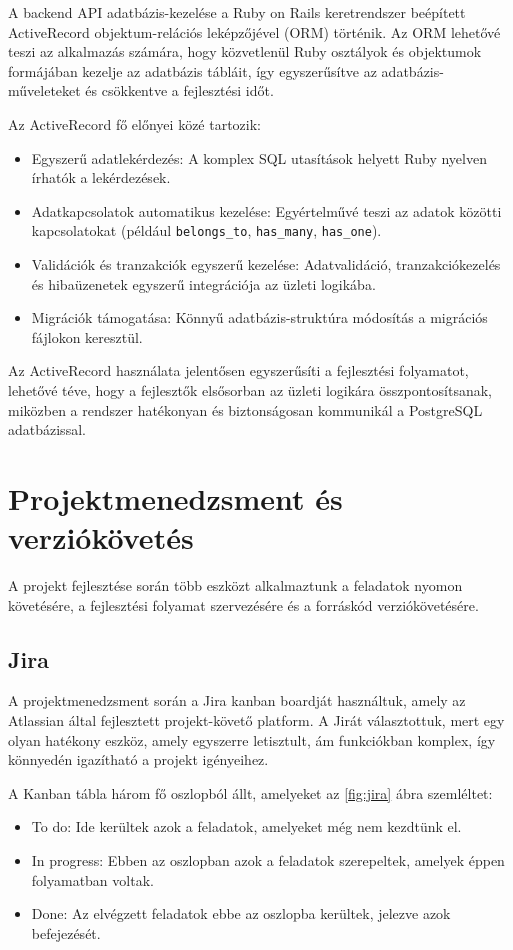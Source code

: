   A backend API adatbázis-kezelése a Ruby on Rails keretrendszer beépített ActiveRecord objektum-relációs leképzőjével (ORM) történik. Az ORM lehetővé teszi az alkalmazás számára, hogy közvetlenül Ruby osztályok és objektumok formájában kezelje az adatbázis tábláit, így egyszerűsítve az adatbázis-műveleteket és csökkentve a fejlesztési időt.
  
  Az ActiveRecord fő előnyei közé tartozik:
  \begin{itemize}
      \item Egyszerű adatlekérdezés: A komplex SQL utasítások helyett Ruby nyelven írhatók a lekérdezések.
      \item Adatkapcsolatok automatikus kezelése: Egyértelművé teszi az adatok közötti kapcsolatokat (például \texttt{belongs\_to}, \texttt{has\_many}, \texttt{has\_one}).
      \item Validációk és tranzakciók egyszerű kezelése: Adatvalidáció, tranzakciókezelés és hibaüzenetek egyszerű integrációja az üzleti logikába.
      \item Migrációk támogatása: Könnyű adatbázis-struktúra módosítás a migrációs fájlokon keresztül.
  \end{itemize}
  
  Az ActiveRecord használata jelentősen egyszerűsíti a fejlesztési folyamatot, lehetővé téve, hogy a fejlesztők elsősorban az üzleti logikára összpontosítsanak, miközben a rendszer hatékonyan és biztonságosan kommunikál a PostgreSQL adatbázissal.
  
  \section{Projektmenedzsment és verziókövetés}

  A projekt fejlesztése során több eszközt alkalmaztunk a feladatok nyomon követésére, a fejlesztési folyamat szervezésére és a forráskód verziókövetésére.
  
  \subsection{Jira}

  A projektmenedzsment során a Jira kanban boardját használtuk, amely az Atlassian által fejlesztett projekt-követő platform. A Jirát választottuk, mert egy olyan hatékony eszköz, amely egyszerre letisztult, ám funkciókban komplex, így könnyedén igazítható a projekt igényeihez. 
  
  A Kanban tábla három fő oszlopból állt, amelyeket az \ref{fig:jira} ábra szemléltet:
  \begin{itemize}
      \item To do: Ide kerültek azok a feladatok, amelyeket még nem kezdtünk el.
      \item In progress: Ebben az oszlopban azok a feladatok szerepeltek, amelyek éppen folyamatban voltak.
      \item Done: Az elvégzett feladatok ebbe az oszlopba kerültek, jelezve azok befejezését.
  \end{itemize}
  
